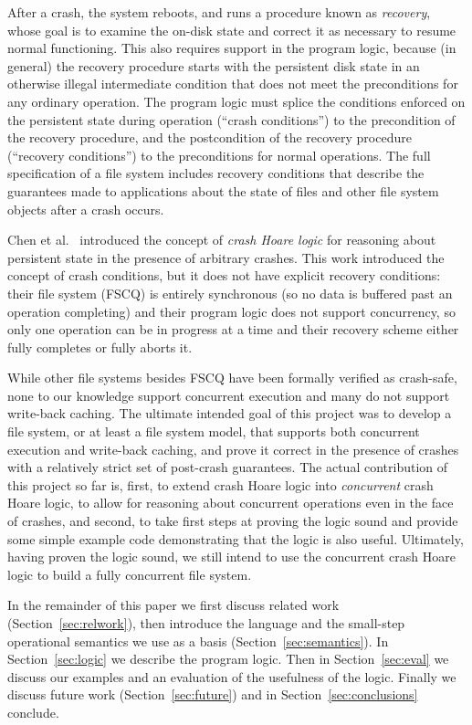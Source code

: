 After a crash, the system reboots, and runs a procedure
known as \emph{recovery}, whose goal is to examine the on-disk state
and correct it as necessary to resume normal functioning.
This also requires support in the program logic, because (in general)
the recovery procedure starts with the persistent disk state in an
otherwise illegal intermediate condition that does not meet the
preconditions for any ordinary operation.
The program logic must splice the conditions enforced on the
persistent state during operation (``crash conditions'') to the
precondition of the recovery procedure, and the postcondition of the
recovery procedure (``recovery conditions'') to the preconditions for
normal operations.
The full specification of a file system includes recovery conditions
that describe the guarantees made to applications about the state of
files and other file system objects after a crash occurs.

Chen et al.~\cite{chen2015using} introduced the concept of \emph{crash
Hoare logic} for reasoning about persistent state in the presence of
arbitrary crashes.
This work introduced the concept of crash conditions, but it does not
have explicit recovery conditions: their file system (FSCQ) is
entirely synchronous (so no data is buffered past an operation
completing) and their program logic does not support concurrency, so
only one operation can be in progress at a time and their recovery
scheme either fully completes or fully aborts it.

While other file systems besides FSCQ have been formally verified as
crash-safe, none to our knowledge support concurrent execution and
many do not support write-back caching.
The ultimate intended goal of this project was to develop a file
system, or at least a file system model, that supports both concurrent
execution and write-back caching, and prove it correct in the presence
of crashes with a relatively strict set of post-crash guarantees.
The actual contribution of this project so far is, first, to extend
crash Hoare logic into \emph{concurrent} crash Hoare logic, to allow
for reasoning about concurrent operations even in the face of crashes,
and second, to take first steps at proving the
logic sound and provide some simple example code demonstrating that
the logic is also useful.
Ultimately, having proven the logic sound, we still intend to use the
concurrent crash Hoare logic to build a fully concurrent file system.

In the remainder of this paper we first discuss related work
(Section~\ref{sec:relwork}), then introduce the language and the
small-step operational semantics we use as a basis (Section~\ref{sec:semantics}).
In Section~\ref{sec:logic} we describe the program logic.
Then in Section~\ref{sec:eval} we discuss our examples and an
evaluation of the usefulness of the logic.
Finally we discuss future work (Section~\ref{sec:future}) and in
Section~\ref{sec:conclusions} conclude.

